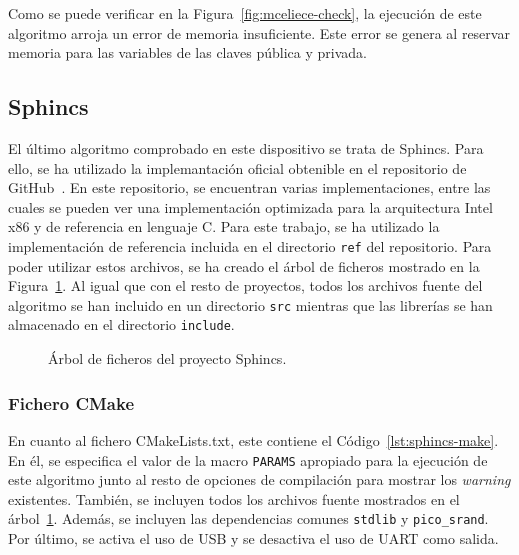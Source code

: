 Como se puede verificar en la Figura~\ref{fig:mceliece-check}, la ejecución de este algoritmo arroja un error de memoria insuficiente.
Este error se genera al reservar memoria para las variables de las claves pública y privada.


\subsection{Sphincs}\label{subsec:sphincs}

El último algoritmo comprobado en este dispositivo se trata de Sphincs.
Para ello, se ha utilizado la implemantación oficial obtenible en el repositorio de GitHub~\cite{sphincs-github}.
En este repositorio, se encuentran varias implementaciones, entre las cuales se pueden ver una implementación optimizada para la arquitectura Intel x86 y de referencia en lenguaje C.
Para este trabajo, se ha utilizado la implementación de referencia incluida en el directorio \texttt{ref} del repositorio.
Para poder utilizar estos archivos, se ha creado el árbol de ficheros mostrado en la Figura~\ref{tree:sphincs}.
Al igual que con el resto de proyectos, todos los archivos fuente del algoritmo se han incluido en un directorio \texttt{src} mientras que las librerías se han  almacenado en el directorio \texttt{include}.

\begin{figure}[H]
\centering
{}
\caption{Árbol de ficheros del proyecto Sphincs.}
\label{tree:sphincs}
\end{figure}


\subsubsection{Fichero CMake}\label{subsubsec:sphincs-cmake}

En cuanto al fichero CMakeLists.txt, este contiene el Código~\ref{lst:sphincs-make}.
En él, se especifica el valor de la macro \texttt{PARAMS} apropiado para la ejecución de este algoritmo junto al resto de opciones de compilación para mostrar los \textit{warning} existentes.
También, se incluyen todos los archivos fuente mostrados en el árbol~\ref{tree:sphincs}.
Además, se incluyen las dependencias comunes \texttt{stdlib} y \texttt{pico\_srand}.
Por último, se activa el uso de \ac{USB} y se desactiva el uso de \ac{UART} como salida.

